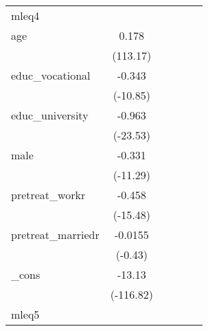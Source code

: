 {\begin{tabular}{l*{5}{c}}
\hline
mleq4       &                     &                     &                     &                     &                     \\
age         &       0.178\sym{***}&                     &                     &                     &                     \\
            &    (113.17)         &                     &                     &                     &                     \\
[1em]
educ\_vocational&      -0.343\sym{***}&                     &                     &                     &                     \\
            &    (-10.85)         &                     &                     &                     &                     \\
[1em]
educ\_university&      -0.963\sym{***}&                     &                     &                     &                     \\
            &    (-23.53)         &                     &                     &                     &                     \\
[1em]
male        &      -0.331\sym{***}&                     &                     &                     &                     \\
            &    (-11.29)         &                     &                     &                     &                     \\
[1em]
pretreat\_workr&      -0.458\sym{***}&                     &                     &                     &                     \\
            &    (-15.48)         &                     &                     &                     &                     \\
[1em]
pretreat\_marriedr&     -0.0155         &                     &                     &                     &                     \\
            &     (-0.43)         &                     &                     &                     &                     \\
[1em]
\_cons      &      -13.13\sym{***}&                     &                     &                     &                     \\
            &   (-116.82)         &                     &                     &                     &                     \\
\hline
mleq5       &                     &                     &                     &                     &                     \\

\end{tabular}}
